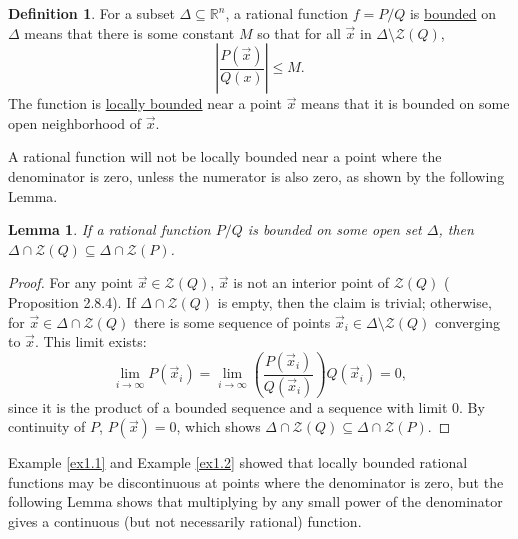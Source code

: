 \documentclass[12pt]{amsart}
\newtheorem{lem}[thm]{Lemma}
\theoremstyle{definition}
\newtheorem{defn}[thm]{Definition}
\theoremstyle{remark}
\numberwithin{equation}{section}
\newcommand{\re}{\mathbb{R}}
\newcommand{\vv}{\mathcal{Z}}
\begin{document}
\begin{defn}\label{def2.4}
  For a subset $\Delta\subseteq\re^n$, a rational function $f=P/Q$ is {\underline{bounded}} on $\Delta$ means that there is some constant $M$ so that for all $\vec x$ in $\Delta\setminus\vv(Q)$, $$\left|\frac{P(\vec x)}{Q(x)}\right|\le M.$$  The function is {\underline{locally bounded}} near a point $\vec x$ means that it is bounded on some open neighborhood of $\vec x$.
\end{defn}
A rational function will not be locally bounded near a point where the denominator is zero, unless the numerator is also zero, as shown by the following Lemma.
\begin{lem}\label{lem2.5}
  If a rational function $P/Q$ is bounded on some open set $\Delta$, then $\Delta\cap\vv(Q)\subseteq\Delta\cap\vv(P)$.
\end{lem}
\begin{proof}
      For any point $\vec x\in\vv(Q)$, $\vec x$ is not an interior point of $\vv(Q)$ (\cite{bcr} Proposition 2.8.4).  If $\Delta\cap\vv(Q)$ is empty, then the claim is trivial; otherwise, for $\vec x\in\Delta\cap\vv(Q)$ there is some sequence of points $\vec x_i\in\Delta\setminus\vv(Q)$ converging to $\vec x$. This limit exists: 
  \begin{equation}\label{eq1}
    \lim_{i\to\infty} P(\vec x_i)=\lim_{i\to\infty}\left(\frac{P(\vec x_i)}{Q(\vec x_i)}\right)Q(\vec x_i)=0,
    \end{equation}
    since it is the product of a bounded sequence and a sequence with limit $0$.  By continuity of $P$, $P(\vec x)=0$, which shows $\Delta\cap\vv(Q)\subseteq\Delta\cap\vv(P)$.
\end{proof}

Example \ref{ex1.1} and Example \ref{ex1.2} showed that locally bounded rational functions may be discontinuous at points where the denominator is zero, but the following Lemma shows that multiplying by any small power of the denominator gives a continuous (but not necessarily rational) function.

\end{document}
